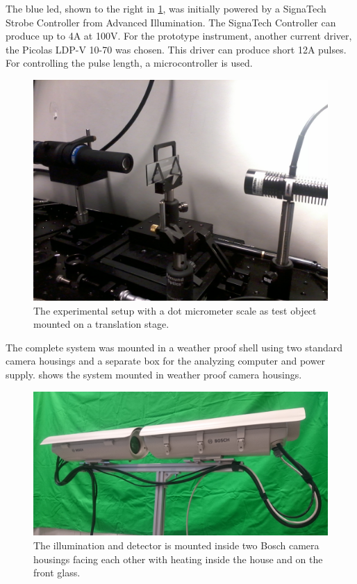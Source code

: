 The blue \gls{led}, shown to the right in \cref{fig:experimental}, was initially powered by a SignaTech Strobe Controller from Advanced Illumination. The SignaTech Controller can produce up to 4A at 100V. For the prototype instrument, another current driver, the Picolas LDP-V 10-70 was chosen. This driver can produce short 12A pulses. For controlling the pulse length, a microcontroller is used. 

\begin{figure}[ht]
\centering\includegraphics[width=0.75\linewidth]{figures/Foto0169}
\caption{The experimental setup with a dot micrometer scale as test object mounted on a translation stage.}
\label{fig:experimental}
\end{figure}

The complete system was mounted in a weather proof shell using two standard camera housings and a separate box for the analyzing computer and power supply.  shows the system mounted in weather proof camera housings. 

\begin{figure}[ht]
\centering\includegraphics[width=0.75\linewidth]{figures/cam_housings}
\caption{The illumination and detector is mounted inside two Bosch camera housings facing each other with heating inside the house and on the front glass.}
\label{fig:housings}
\end{figure}


